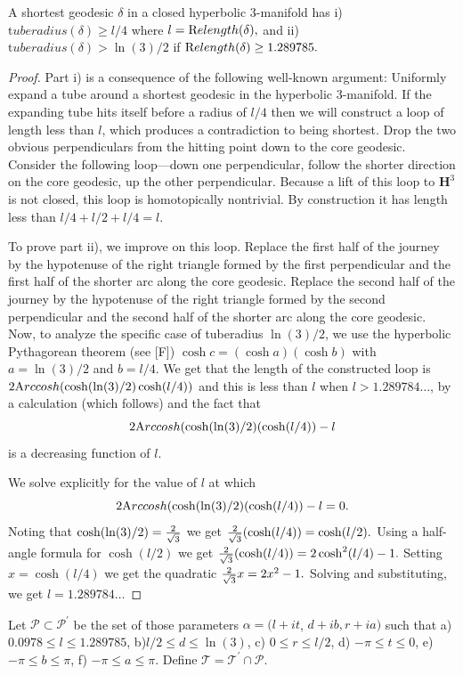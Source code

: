 \begin{proposition}\label{GMT prop1.11} A {\textrm shortest}  geodesic $\delta$ in a closed hyperbolic $3$\/{\textrm -}\/manifold has 
{\textrm i)}  ${\mathrm tuberadius}(\delta) \ge l/4$ where $l = {\textrm Relength}(\delta),$  and
{\textrm ii)} ${\mathrm tuberadius}(\delta) > \ln(3)/2$ if 
${\textrm Relength}(\delta) \ge 1.289785.$ 
\end{proposition}

\begin{proof} Part i) is a consequence of the following 
well-known argument:
Uniformly expand a tube around a shortest geodesic in the hyperbolic
$3$-manifold. 
If the expanding tube hits itself before a
radius of $l/4$ then we will construct a loop of length less than $l$, which produces a
contradiction to being shortest.  Drop the two obvious perpendiculars from
the hitting point down to the core geodesic. 
Consider the following loop---down one perpendicular, 
follow the shorter direction on the core geodesic,
up the other perpendicular. Because a lift of this loop
to ${\mathbf H}^3$ is not closed, this loop is homotopically nontrivial.  By
construction it has length less than $l/4 + l/2 + l/4 = l.$  

To prove part ii), we improve on this loop.  
Replace the first half of the journey by the
hypotenuse of the right triangle formed by the first perpendicular and the
first half of the shorter arc along the core geodesic.  Replace the second
half of the journey by the hypotenuse of the right triangle formed by the
second perpendicular and the second half of the shorter arc along the core
geodesic.  
Now, to analyze the specific case of tuberadius $\ln(3)/2$, we use
the hyperbolic Pythagorean theorem (see [F]) 
$\cosh c = (\cosh a)
( \cosh b)$ with $a = \ln(3)/2$ and $b = l/4.$ 
We get that the length of the
constructed loop is $2 {\textrm Arccosh} (\cosh(\ln(3)/2) \cosh (l/4))$ and this is
less than $l$ when $l > 1.289784\ldots$, 
by a calculation (which follows) and the fact that $$2 {\textrm Arccosh} (\cosh(\ln(3)/2) (\cosh (l/4)) - l$$ is a decreasing function of $l$.

We solve explicitly for the value of $l$ at which
$$2 {\textrm Arccosh} (\cosh(\ln(3)/2) (\cosh (l/4)) - l = 0.$$  Noting that
$\cosh(\ln(3)/2) = {2 \over \sqrt 3}$ we get ${2 \over \sqrt 3}(\cosh (l/4)) 
= \cosh(l/2).$  Using a half-angle formula for $\cosh(l/2)$ we get ${2
\over \sqrt 3}(\cosh (l/4))  = 2\cosh^2(l/4) - 1.$  Setting $x =
\cosh(l/4)$ we get the quadratic ${2 \over \sqrt 3} x = 2 x^2 -1.$
Solving and substituting, we get $l = 1.289784\ldots$ \end{proof}
\begin{definition}\label{GMT 1.12}
Let ${\mathcal P}\subset{\mathcal P}^{\prime}$ be the set of those parameters $\alpha
= (l+it$, $d+ib, r+ia)$ such
that
 a)       $0.0978\le l \le 1.289785$,
 b)\enspace      $l/2 \le d\le \ln(3)$,
 c) \enspace   $0\le r \le l/2$,
 d) \enspace      $-\pi \le t \le 0$,
 e) \enspace	$-\pi \le b \le \pi$,
 f) \enspace	$-\pi \le a \le \pi$.
\noindent 
Define ${\mathcal T}={\mathcal T}^{\prime}\cap {\mathcal P}.$
\end{definition}


